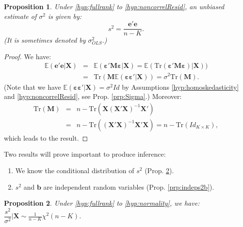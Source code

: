 \documentclass[
  12pt,
]{book}
\providecommand{\tightlist}{%
  \setlength{\itemsep}{0pt}\setlength{\parskip}{0pt}}
\newtheorem{proposition}{Proposition}[chapter]
\theoremstyle{definition}
\theoremstyle{definition}
\theoremstyle{definition}
\theoremstyle{definition}
\theoremstyle{remark}
\begin{document}
\begin{proposition}
\protect\hypertarget{prp:expects2}{}\label{prp:expects2}Under \ref{hyp:fullrank} to \ref{hyp:noncorrelResid}, an unbiased estimate of \(\sigma^2\) is given by:
\begin{equation}
s^2 = \frac{\mathbf{e}'\mathbf{e}}{n-K}.\label{eq:s2}
\end{equation}
(It is sometimes denoted by \(\sigma^2_{OLS}\).)
\end{proposition}

\begin{proof}
We have:
\begin{eqnarray*}
\mathbb{E}(\mathbf{e}'\mathbf{e}|\mathbf{X})&=&\mathbb{E}(\boldsymbol{\varepsilon}'\mathbf{M}\boldsymbol{\varepsilon}|\mathbf{X})=\mathbb{E}(\mbox{Tr}(\boldsymbol{\varepsilon}'\mathbf{M}\boldsymbol{\varepsilon})|\mathbf{X}))\\
&=&\mbox{Tr}(\mathbf{M}\mathbb{E}(\boldsymbol{\varepsilon}\boldsymbol{\varepsilon}'|\mathbf{X}))=\sigma^2 \mbox{Tr}(\mathbf{M}).
\end{eqnarray*}
(Note that we have \(\mathbb{E}(\boldsymbol{\varepsilon}\boldsymbol{\varepsilon}'|\mathbf{X})=\sigma^2Id\) by Assumptions \ref{hyp:homoskedasticity} and \ref{hyp:noncorrelResid}, see Prop. \ref{prp:Sigma}.) Moreover:
\begin{eqnarray*}
\mbox{Tr}(\mathbf{M})&=&n-\mbox{Tr}(\mathbf{X}(\mathbf{X}'\mathbf{X})^{-1}\mathbf{X}')\\
&=&n-\mbox{Tr}((\mathbf{X}'\mathbf{X})^{-1}\mathbf{X}'\mathbf{X})=n-\mbox{Tr}(Id_{K \times K}),
\end{eqnarray*}
which leads to the result.
\end{proof}

Two results will prove important to produce inference:

\begin{enumerate}
\def\labelenumi{\roman{enumi}.}
\tightlist
\item
  We know the conditional distribution of \(s^2\) (Prop. \ref{prp:s2distri}).
\item
  \(s^2\) and \(\mathbf{b}\) are independent random variables (Prop. \ref{prp:indeps2b}).
\end{enumerate}

\begin{proposition}
\protect\hypertarget{prp:s2distri}{}\label{prp:s2distri}Under \ref{hyp:fullrank} to \ref{hyp:normality}, we have: \(\dfrac{s^2}{\sigma^2} | \mathbf{X} \sim \frac{1}{n-K}\chi^2(n-K)\).
\end{proposition}
\end{document}
